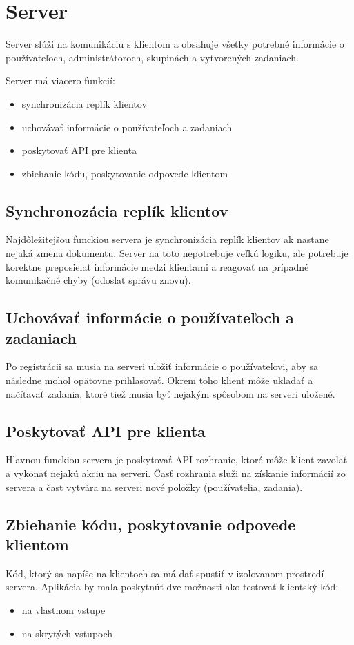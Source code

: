 \section{Server}
Server slúži na komunikáciu s klientom a obsahuje všetky potrebné informácie o používateľoch,
administrátoroch, skupinách a vytvorených zadaniach.

Server má viacero funkcií:
\begin{itemize}
\item synchronizácia replík klientov
\item uchovávať informácie o používateľoch a zadaniach
\item poskytovať API pre klienta
\item zbiehanie kódu, poskytovanie odpovede klientom
\end{itemize}

\subsection{Synchronozácia replík klientov}
Najdôležitejšou funckiou servera je synchronizácia replík klientov ak nastane nejaká zmena
dokumentu. Server na toto nepotrebuje veľkú logiku, ale potrebuje korektne preposielať informácie
medzi klientami a reagovať na prípadné komunikačné chyby (odoslať správu znovu).

\subsection{Uchovávať informácie o používateľoch a zadaniach}
Po registrácii sa musia na serveri uložiť informácie o používateľovi, aby sa následne mohol opätovne
prihlasovať. Okrem toho klient môže ukladať a načítavať zadania, ktoré tiež musia byť nejakým
spôsobom na serveri uložené.

\subsection{Poskytovať API pre klienta}
Hlavnou funckiou servera je poskytovať API rozhranie, ktoré môže klient zavolať a vykonať nejakú
akciu na serveri. Časť rozhrania služi na získanie informácií zo servera a čast vytvára
na serveri nové položky (používatelia, zadania).

\subsection{Zbiehanie kódu, poskytovanie odpovede klientom}
Kód, ktorý sa napíše na klientoch sa má dať spustiť v izolovanom prostredí servera. Aplikácia by
mala poskytnúť dve možnosti ako testovať klientský kód:
\begin{itemize}
\item na vlastnom vstupe
\item na skrytých vstupoch
\end{itemize}

